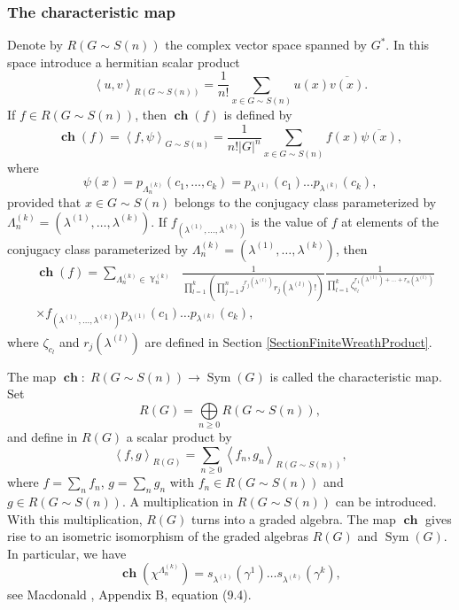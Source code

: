 \documentclass[12pt]{amsart}
\theoremstyle{definition}
\numberwithin{equation}{section}
\DeclareMathOperator{\Y}{\mathbb{Y}}
\DeclareMathOperator{\ch}{\textbf{ch}}
\DeclareMathOperator{\Sym}{Sym}
\begin{document}
\subsubsection{The characteristic map}\label{SectionAlgebraSymmetricFunctions1}
Denote by $R\left(G\sim S(n)\right)$ the complex vector space spanned by $G^{\ast}$. In this space introduce a hermitian scalar product
$$
\left<u,v\right>_{R\left(G\sim S(n)\right)}=\frac{1}{n!}
\sum\limits_{x\in G\sim S(n)}u(x)\overline{v(x)}.
$$
If $f\in R\left(G\sim S(n)\right)$, then $\ch(f)$ is defined by
\begin{equation}
\ch(f)=\left\langle f,\psi\right\rangle_{G\sim S(n)}=\frac{1}{n!|G|^n}\sum\limits_{x\in G\sim S(n)}f(x)\overline{\psi(x)},
\end{equation}
where
$$
\psi(x)=p_{\Lambda_n^{(k)}}\left(c_1,\ldots,c_k\right)=p_{\lambda^{(1)}}(c_1)\ldots p_{\lambda^{(k)}}(c_k),
$$
provided that $x\in G\sim S(n)$ belongs to the conjugacy class parameterized by $\Lambda_n^{(k)}=\left(\lambda^{(1)},\ldots,\lambda^{(k)}\right)$. If $f_{\left(\lambda^{(1)},\ldots,\lambda^{(k)}\right)}$
is the value of $f$ at elements of the conjugacy class parameterized by $\Lambda_n^{(k)}=\left(\lambda^{(1)},\ldots,\lambda^{(k)}\right)$, then
\begin{equation}
\begin{split}
&\ch(f)=\sum\limits_{\Lambda_n^{(k)}\in\Y_n^{(k)}}\;\;\frac{1}{\prod\limits_{l=1}^k\left(\prod\limits_{j=1}^n
j^{r_j(\lambda^{(l)})}r_j(\lambda^{(l)})!\right)}
\frac{1}{\prod\limits_{l=1}^k\zeta_{c_l}^{r_1(\lambda^{(l)})+\ldots+r_n(\lambda^{(l)})}}\\
&\times f_{\left(\lambda^{(1)},\ldots,\lambda^{(k)}\right)}p_{\lambda^{(1)}}(c_1)\ldots p_{\lambda^{(k)}}(c_k),
\end{split}
\end{equation}
where $\zeta_{c_l}$ and $r_j\left(\lambda^{(l)}\right)$ are defined in Section
\ref{SectionFiniteWreathProduct}.

The map $\ch:\; R\left(G\sim S(n)\right)\longrightarrow \Sym\left(G\right)$ is called the characteristic map.
Set
$$
R\left(G\right)=\bigoplus\limits_{n\geq 0}R\left(G\sim S(n)\right),
$$
and define in $R\left(G\right)$ a scalar product by
$$
\left<f,g\right>_{R\left(G\right)}=\sum\limits_{n\geq 0}\left<f_n,g_n\right>_{R\left(G\sim S(n)\right)},
$$
where $f=\sum\limits_nf_n$, $g=\sum\limits_n g_n$ with
$f_n\in R\left(G\sim S(n)\right)$ and $g\in R\left(G\sim S(n)\right)$.
A multiplication in $R\left(G\sim S(n)\right)$ can be introduced. With this multiplication, $R\left(G\right)$ turns into
a graded algebra.
The map $\ch$ gives rise to an isometric isomorphism of the graded algebras
$R\left(G\right)$ and $\Sym\left(G\right)$. In particular, we have
\begin{equation}
\ch\left(\chi^{\Lambda_n^{(k)}}\right)=s_{\lambda^{(1)}}\left(\gamma^{1}\right)
\ldots s_{\lambda^{(k)}}\left(\gamma^{k}\right),
\end{equation}
see Macdonald \cite{Macdonald}, Appendix B, equation (9.4).
\end{document}
